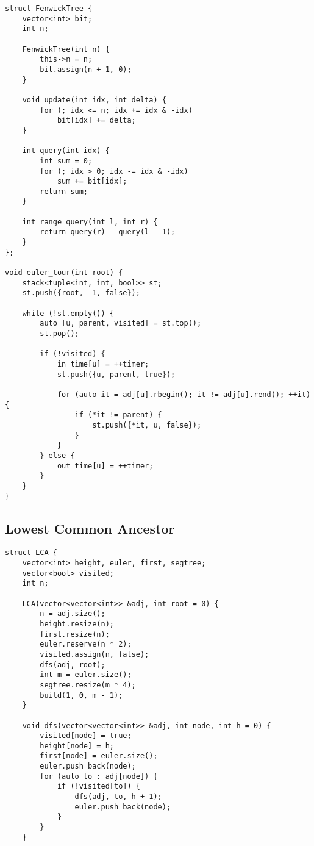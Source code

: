 \documentclass[10pt]{article}
\begin{document}
\begin{multicols*}{2}
\begin{lstlisting}[style=compactcpp]
struct FenwickTree {
    vector<int> bit;
    int n;

    FenwickTree(int n) {
        this->n = n;
        bit.assign(n + 1, 0);
    }

    void update(int idx, int delta) {
        for (; idx <= n; idx += idx & -idx)
            bit[idx] += delta;
    }

    int query(int idx) {
        int sum = 0;
        for (; idx > 0; idx -= idx & -idx)
            sum += bit[idx];
        return sum;
    }

    int range_query(int l, int r) {
        return query(r) - query(l - 1);
    }
};

void euler_tour(int root) {
    stack<tuple<int, int, bool>> st;
    st.push({root, -1, false});

    while (!st.empty()) {
        auto [u, parent, visited] = st.top();
        st.pop();

        if (!visited) {
            in_time[u] = ++timer;
            st.push({u, parent, true});

            for (auto it = adj[u].rbegin(); it != adj[u].rend(); ++it) {
                if (*it != parent) {
                    st.push({*it, u, false});
                }
            }
        } else {
            out_time[u] = ++timer;
        }
    }
}

\end{lstlisting}

\subsection{Lowest Common Ancestor}

\begin{lstlisting}[style=compactcpp]
struct LCA {
    vector<int> height, euler, first, segtree;
    vector<bool> visited;
    int n;

    LCA(vector<vector<int>> &adj, int root = 0) {
        n = adj.size();
        height.resize(n);
        first.resize(n);
        euler.reserve(n * 2);
        visited.assign(n, false);
        dfs(adj, root);
        int m = euler.size();
        segtree.resize(m * 4);
        build(1, 0, m - 1);
    }

    void dfs(vector<vector<int>> &adj, int node, int h = 0) {
        visited[node] = true;
        height[node] = h;
        first[node] = euler.size();
        euler.push_back(node);
        for (auto to : adj[node]) {
            if (!visited[to]) {
                dfs(adj, to, h + 1);
                euler.push_back(node);
            }
        }
    }


\end{lstlisting}
\end{multicols*}
\end{document}
